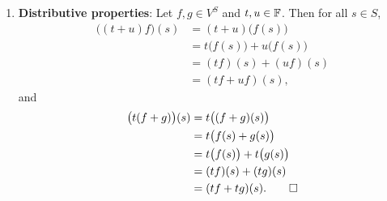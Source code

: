 \begin{exc}
\begin{solution}
\begin{enumerate}[label=\arabic*)]
\item \textbf{Distributive properties}: Let $f,g\in V^S$ and $t,u\in\mathbb{F}$. Then
  for all $s\in S$,
  \begin{align*}
  \bigl((t+u)f\bigr)(s) &= (t+u)\bigl(f(s)\bigr)\\
    &= t\bigl(f(s)\bigr)+u\bigl(f(s)\bigr)\\
    &= (tf)(s)+(uf)(s)\\
    &= (tf+uf)(s),
  \end{align*}
  and
  \begin{align*}
  \bigl(t(f+g)\bigr)(s) &= t\bigl((f+g)(s)\bigr)\\
    &= t\bigl(f(s)+g(s)\bigr)\\
    &= t\bigl(f(s)\bigr)+t\bigl(g(s)\bigr)\\
    &= (tf)(s)+(tg)(s)\\
    &= (tf+tg)(s). \qedhere
  \end{align*}
\end{enumerate}
\end{solution}


\end{exc}
